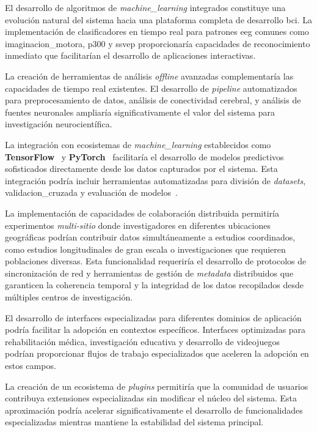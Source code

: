 El desarrollo de algoritmos de \textit{\gls{machine_learning}} integrados constituye una evolución natural del sistema hacia una plataforma completa de desarrollo \acrshort{bci}. La implementación de clasificadores en tiempo real para patrones \acrshort{eeg} comunes como \gls{imaginacion_motora}, \gls{p300} y \gls{ssvep} proporcionaría capacidades de reconocimiento inmediato que facilitarían el desarrollo de aplicaciones interactivas.

La creación de herramientas de análisis \textit{offline} avanzadas complementaría las capacidades de tiempo real existentes. El desarrollo de \textit{\gls{pipeline}} automatizados para preprocesamiento de datos, análisis de conectividad cerebral, y análisis de fuentes neuronales ampliaría significativamente el valor del sistema para investigación neurocientífica.

La integración con ecosistemas de \textit{\gls{machine_learning}} establecidos como \textbf{TensorFlow}~\cite{tensorflow2015} y \textbf{PyTorch}~\cite{pytorch2019} facilitaría el desarrollo de modelos predictivos sofisticados directamente desde los datos capturados por el sistema. Esta integración podría incluir herramientas automatizadas para división de \textit{\glspl{dataset}}, \gls{validacion_cruzada} y evaluación de modelos~\cite{Garrett2014}.

La implementación de capacidades de colaboración distribuida permitiría experimentos \textit{multi-sitio} donde investigadores en diferentes ubicaciones geográficas podrían contribuir datos simultáneamente a estudios coordinados, como estudios longitudinales de gran escala o investigaciones que requieren poblaciones diversas. Esta funcionalidad requeriría el desarrollo de protocolos de sincronización de red y herramientas de gestión de \textit{metadata} distribuidos que garanticen la coherencia temporal y la integridad de los datos recopilados desde múltiples centros de investigación.

El desarrollo de interfaces especializadas para diferentes dominios de aplicación podría facilitar la adopción en contextos específicos. Interfaces optimizadas para rehabilitación médica, investigación educativa y desarrollo de videojuegos~\cite{Song2017,10.1007/978-3-319-26350-2_44,10.1007/978-3-319-00846-2_408} podrían proporcionar flujos de trabajo especializados que aceleren la adopción en estos campos.

La creación de un ecosistema de \textit{\gls{plugins}} permitiría que la comunidad de usuarios contribuya extensiones especializadas sin modificar el núcleo del sistema. Esta aproximación podría acelerar significativamente el desarrollo de funcionalidades especializadas mientras mantiene la estabilidad del sistema principal.

